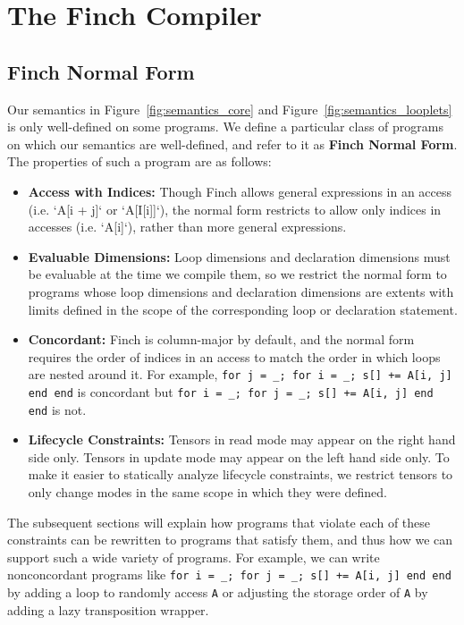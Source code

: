 \section{The Finch Compiler}

\subsection{Finch Normal Form}

Our semantics in Figure~\ref{fig:semantics_core} and Figure~\ref{fig:semantics_looplets} is only
well-defined on some programs. We define a particular class of programs on which
our semantics are well-defined, and refer to it as \textbf{Finch Normal Form}.
The properties of such a program are as follows:
\begin{itemize}
    \item \textbf{Access with Indices:} Though Finch allows general expressions in an
    access (i.e. `A[i + j]` or `A[I[i]]`), the normal form restricts to allow only indices in 
    accesses (i.e. `A[i]`), rather than more general expressions.
    \item \textbf{Evaluable Dimensions:} Loop dimensions and declaration dimensions must
    be evaluable at the time we compile them, so we restrict the normal form to
    programs whose loop dimensions and declaration dimensions are extents with
    limits defined in the scope of the corresponding loop or declaration
    statement.
    \item \textbf{Concordant:} Finch is column-major by default, and the normal form
    requires the order of indices in an access to match the order in which loops
    are nested around it.  For example,
    \texttt{for j = _; for i = _; s[] += A[i, j] end end}
    is concordant but
    \texttt{for i = _; for j = _; s[] += A[i, j] end end} is not.
    \item \textbf{Lifecycle Constraints:} Tensors in read mode may appear on the right
    hand side only. Tensors in update mode may appear on the left hand side
    only. To make it easier to statically analyze lifecycle constraints, we
    restrict tensors to only change modes in the same scope in which they were
    defined.
\end{itemize}

The subsequent sections will explain how programs that violate each of these
constraints can be rewritten to programs that satisfy them, and thus how we can
support such a wide variety of programs. For example, we can write nonconcordant
programs like  \texttt{for i = _; for j = _; s[] += A[i, j] end end}
by adding a loop to randomly access \texttt{A} or adjusting the
storage order of \texttt{A} by adding a lazy transposition wrapper.

